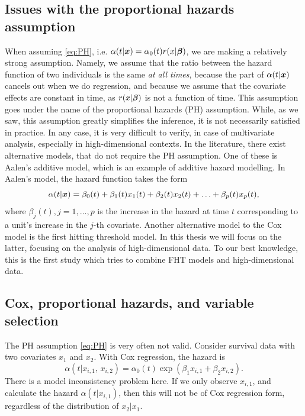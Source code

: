 \subsection{Issues with the proportional hazards assumption}
When assuming \eqref{eq:PH}, i.e. $\alpha(t|\bm{x})=\alpha_0(t)r(x|\boldsymbol{\beta})$, we are making a relatively strong assumption.
Namely, we assume that the ratio between the hazard function of two individuals is the same \textit{at all times}, because the part of $\alpha(t|\bm{x})$ cancels out when we do regression, and because we assume that the covariate effects are constant in time, as $r(x|\boldsymbol{\beta})$ is not a function of time.
This assumption goes under the name of the proportional hazards (PH) assumption.
While, as we saw, this assumption greatly simplifies the inference, it is not necessarily satisfied in practice.
In any case, it is very difficult to verify, in case of multivariate analysis, especially in high-dimensional contexts.
In the literature, there exist alternative models, that do not require the PH assumption.
One of these is Aalen's additive model, which is an example of additive hazard modelling.
In Aalen's model, the hazard function takes the form
\begin{equation*}
    \alpha(t|\bm{x})=\beta_0(t)+\beta_1(t)x_1(t)+\beta_2(t)x_2(t)+\ldots+\beta_p(t)x_p(t),
\end{equation*}
where $\beta_j(t),j=1,\ldots,p$ is the increase in the hazard at time $t$ corresponding to a unit's increase in the $j$-th covariate. Another alternative model to the Cox model is the first hitting threshold model.
In this thesis we will focus on the latter, focusing on the analysis of high-dimensional data.
To our best knowledge, this is the first study which tries to combine FHT models and high-dimensional data.

\subsection{Cox, proportional hazards, and variable selection}
The PH assumption \eqref{eq:PH} is very often not valid.
Consider survival data with two covariates $x_1$ and $x_2$.
With Cox regression, the hazard is
\begin{equation*}
    \alpha(t|x_{i,1},\,x_{i,2})=\alpha_0(t)\exp(\beta_1x_{i,1}+\beta_2x_{i,2}).
\end{equation*}
There is a model inconsistency problem here.
If we only observe $x_{i,1}$, and calculate the hazard $\alpha(t|x_{i,1})$, then this will not be of Cox regression form, regardless of the distribution of $x_2|x_1$.

